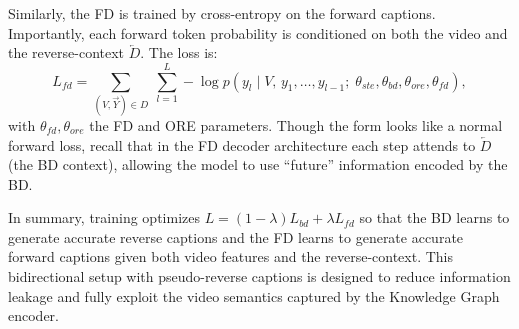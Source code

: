 Similarly, the FD is trained by cross-entropy on the forward captions. Importantly, each forward token probability is conditioned on both the video and the reverse-context $\overleftarrow{D}$. The loss is:
$$
L_{fd} = \sum_{(V,\overrightarrow{Y})\in D}\;\sum_{l=1}^L -\log p(y_l \mid V,\,y_1,\dots,y_{l-1};\;\theta_{ste},\theta_{bd},\theta_{ore},\theta_{fd}),
$$
with $\theta_{fd},\theta_{ore}$ the FD and ORE parameters. Though the form looks like a normal forward loss, recall that in the FD decoder architecture each step attends to $\overleftarrow{D}$ (the BD context), allowing the model to use ``future'' information encoded by the BD.

In summary, training optimizes $L = (1-\lambda)L_{bd} + \lambda L_{fd}$ so that the BD learns to generate accurate reverse captions and the FD learns to generate accurate forward captions given both video features and the reverse-context. This bidirectional setup with pseudo-reverse captions is designed to reduce information leakage and fully exploit the video semantics captured by the Knowledge Graph encoder.